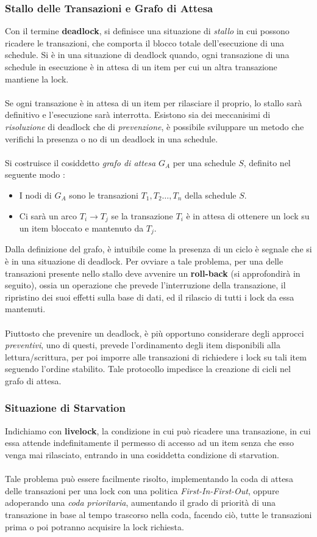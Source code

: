 \documentclass[12pt, letterpaper]{article}
\newcommand{\acc}{\\\hphantom{}\\}
\begin{document}
 \subsubsection{Stallo delle Transazioni e Grafo di Attesa}
 Con il termine \textbf{deadlock}, si definisce una situazione di \textit{stallo} in cui possono ricadere le transazioni, che 
 comporta il blocco totale dell'esecuzione di una schedule. Si è in una situazione di deadlock quando, ogni transazione 
 di una schedule in esecuzione è in attesa di un item per cui un altra transazione mantiene la lock. \acc Se ogni transazione 
 è in attesa di un item per rilasciare il proprio, lo stallo sarà definitivo e l'esecuzione sarà interrotta. Esistono sia 
 dei meccanisimi di \textit{risoluzione} di deadlock che di \textit{prevenzione}, è possibile sviluppare un metodo che verifichi 
 la presenza o no di un deadlock in una schedule.
\acc
 Si costruisce il cosiddetto \textit{grafo di attesa} \(G_A\) per una schedule \(S\), definito nel seguente modo :\begin{itemize}
    \item I nodi di \(G_A\) sono le transazioni \(T_1,T_2\dots,T_n\) della schedule \(S\). 
    \item Ci sarà un arco \(T_i\rightarrow T_j\) se la transazione \(T_i\) è in attesa di ottenere un lock su un item 
    bloccato e mantenuto da \(T_j\).
 \end{itemize}
 Dalla definizione del grafo, è intuibile come la presenza di un ciclo è segnale che si è in una situazione di deadlock.
 Per ovviare a tale problema, per una delle transazioni presente nello stallo deve avvenire un \textbf{roll-back} (si approfondirà 
 in seguito), 
 ossia un operazione che prevede l'interruzione della transazione, il ripristino dei suoi effetti sulla base di dati, 
 ed il rilascio di tutti i lock da essa mantenuti.\acc 
 Piuttosto che prevenire un deadlock, è più opportuno considerare degli approcci \textit{preventivi}, uno di questi, 
 prevede l'ordinamento degli item disponibili alla lettura/scrittura, per poi imporre alle transazioni di 
 richiedere i lock su tali item seguendo l'ordine stabilito. Tale protocollo impedisce la creazione di cicli nel 
 grafo di attesa.
\subsubsection{Situazione di Starvation}
Indichiamo con \textbf{livelock}, la condizione in cui può ricadere una transazione, in cui essa attende 
indefinitamente il permesso di accesso ad un item senza che esso venga mai rilasciato, entrando in una 
cosiddetta condizione di starvation.\acc Tale problema può essere facilmente 
risolto, implementando la coda di attesa delle transazioni per una lock con una politica \textit{First-In-First-Out}, oppure 
adoperando una \textit{coda prioritaria}, aumentando il grado di priorità di una transazione in base al tempo trascorso 
nella coda, facendo ciò, tutte le transazioni prima o poi potranno acquisire la lock richiesta.
\end{document}
